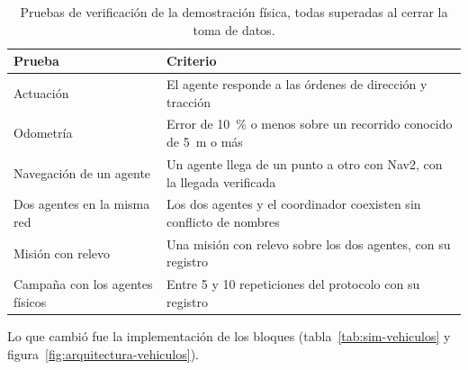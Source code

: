 \label{sec:pruebas-verificacion}
\begin{table}[H]
  \centering\footnotesize{}
  \caption{Pruebas de verificación de la demostración física, todas superadas al cerrar la toma de datos.}
  \label{tab:pruebas-verificacion}
  \begin{tabular}{@{}>{\raggedright\arraybackslash}p{}>{\raggedright\arraybackslash}p{}@{}}
    \toprule
    \textbf{Prueba} & \textbf{Criterio} \\ \midrule
    Actuación & El agente responde a las órdenes de dirección y tracción \\
    Odometría & Error de 10~\% o menos sobre un recorrido conocido de 5~m o más \\
    Navegación de un agente & Un agente llega de un punto a otro con Nav2, con la llegada verificada \\
    Dos agentes en la misma red & Los dos agentes y el coordinador coexisten sin conflicto de nombres \\
    Misión con relevo & Una misión con relevo sobre los dos agentes, con su registro \\
    Campaña con los agentes físicos & Entre 5 y 10 repeticiones del protocolo con su registro \\ \bottomrule
  \end{tabular}
\end{table}

Lo que cambió fue la implementación de los bloques (tabla~\ref{tab:sim-vehiculos} y figura~\ref{fig:arquitectura-vehiculos}).

